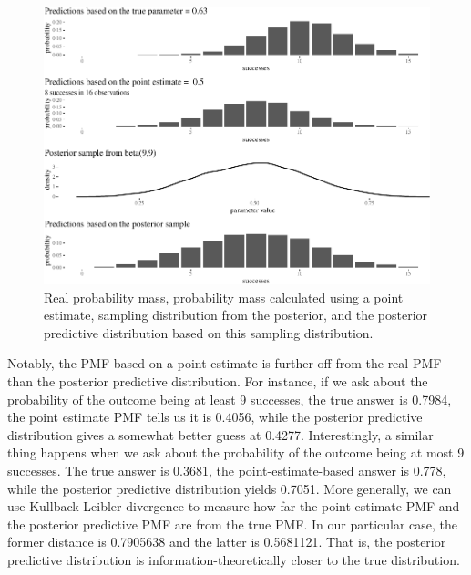 \documentclass[
  10pt,
  dvipsnames,enabledeprecatedfontcommands]{scrartcl}
\begin{document}
\begin{figure}[H]

\begin{center}\includegraphics[width=0.9\linewidth]{chapter-outline_files/figure-latex/fig:posteriorPrediction2-1} \end{center}


\caption{Real probability mass, probability mass calculated using a point estimate, sampling distribution from the posterior, and the posterior predictive distribution based on this sampling distribution.}
\label{fig:posteriorPrediction}
\end{figure}

Notably, the PMF based on a point estimate is further off from the real
PMF than the posterior predictive distribution. For instance, if we ask
about the probability of the outcome being at least 9 successes, the
true answer is 0.7984, the point estimate PMF tells us it is 0.4056,
while the posterior predictive distribution gives a somewhat better
guess at 0.4277. Interestingly, a similar thing happens when we ask
about the probability of the outcome being at most 9 successes. The true
answer is 0.3681, the point-estimate-based answer is 0.778, while the
posterior predictive distribution yields 0.7051. More generally, we can
use Kullback-Leibler divergence to measure how far the point-estimate
PMF and the posterior predictive PMF are from the true PMF. In our
particular case, the former distance is 0.7905638 and the latter is
0.5681121. That is, the posterior predictive distribution is
information-theoretically closer to the true distribution.
\end{document}
